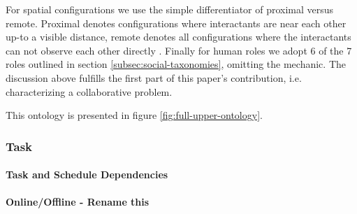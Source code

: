 \documentclass[letterpaper, 10 pt, conference]{ieeeconf}  %
\theoremstyle{definition}
\begin{document}
For spatial configurations we use the simple differentiator of proximal versus remote.
Proximal denotes configurations where interactants are near each other up-to a visible distance, remote denotes all configurations where the interactants can not observe each other directly \cite{Cha2018, Kolling2016}.
Finally for human roles we adopt 6 of the 7 roles outlined in section \ref{subsec:social-taxonomies}, omitting the mechanic.
The discussion above fulfills the first part of this paper's contribution, i.e. characterizing a collaborative problem.

This ontology is presented in figure \ref{fig:full-upper-ontology}.

\subsubsection{Task}
\paragraph{Task and Schedule Dependencies}

\paragraph{Online/Offline - Rename this}
\end{document}
